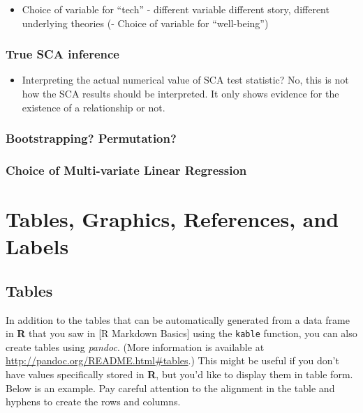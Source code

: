 \documentclass[12pt,twoside]{reedthesis}
\providecommand{\tightlist}{%
  \setlength{\itemsep}{0pt}\setlength{\parskip}{0pt}}
\begin{document}
  \begin{itemize}
  \tightlist
  \item
    Choice of variable for ``tech'' - different variable different story,
    different underlying theories (- Choice of variable for
    ``well-being'')
  \end{itemize}
  
  \subsection{True SCA inference}\label{true-sca-inference}
  
  \begin{itemize}
  \tightlist
  \item
    Interpreting the actual numerical value of SCA test statistic? No,
    this is not how the SCA results should be interpreted. It only shows
    evidence for the existence of a relationship or not.
  \end{itemize}
  
  \subsection{Bootstrapping?
  Permutation?}\label{bootstrapping-permutation}
  
  \subsection{Choice of Multi-variate Linear
  Regression}\label{choice-of-multi-variate-linear-regression}
  
  \chapter{Tables, Graphics, References, and Labels}\label{ref-labels}
  
  \section{Tables}\label{tables}
  
  In addition to the tables that can be automatically generated from a
  data frame in \textbf{R} that you saw in {[}R Markdown Basics{]} using
  the \texttt{kable} function, you can also create tables using
  \emph{pandoc}. (More information is available at
  \url{http://pandoc.org/README.html\#tables}.) This might be useful if
  you don't have values specifically stored in \textbf{R}, but you'd like
  to display them in table form. Below is an example. Pay careful
  attention to the alignment in the table and hyphens to create the rows
  and columns.
  
\end{document}
